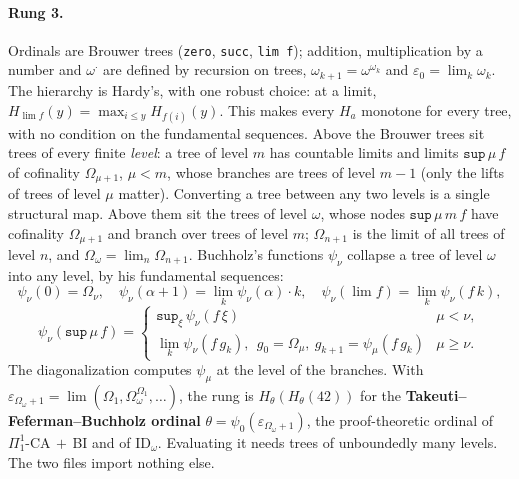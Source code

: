 \documentclass[11pt]{article}
\theoremstyle{definition}
\theoremstyle{remark}
\newcommand{\lean}[1]{\texttt{#1}}
\begin{document}
\paragraph{Rung 3.} Ordinals are Brouwer trees (\lean{zero}, \lean{succ},
\lean{lim f}); addition, multiplication by a number and $\omega^{\cdot}$ are
defined by recursion on trees, $\omega_{k+1}=\omega^{\omega_k}$ and
$\varepsilon_0=\lim_k\omega_k$. The hierarchy is Hardy's, with one robust
choice: at a limit, $H_{\lim f}(y)=\max_{i\le y}H_{f(i)}(y)$. This makes every
$H_a$ monotone for every tree, with no condition on the fundamental sequences.
Above the Brouwer trees sit trees of every finite \emph{level}: a tree of
level $m$ has countable limits and limits $\mathtt{sup}\,\mu\,f$ of cofinality
$\Omega_{\mu+1}$, $\mu<m$, whose branches are trees of level $m-1$ (only the
lifts of trees of level $\mu$ matter). Converting a tree between any two
levels is a single structural map. Above them sit the trees of level $\omega$,
whose nodes $\mathtt{sup}\,\mu\,m\,f$ have cofinality $\Omega_{\mu+1}$ and
branch over trees of level $m$; $\Omega_{n+1}$ is the limit of all trees of
level $n$, and $\Omega_\omega=\lim_n\Omega_{n+1}$. Buchholz's functions
$\psi_\nu$ collapse a tree of level $\omega$ into any level, by his
fundamental sequences:
\[
\psi_\nu(0)=\Omega_\nu,\quad
\psi_\nu(\alpha+1)=\lim_k\psi_\nu(\alpha)\cdot k,\quad
\psi_\nu(\lim f)=\lim_k\psi_\nu(f\,k),
\]
\[
\psi_\nu(\mathtt{sup}\,\mu\,f)=
\begin{cases}
\mathtt{sup}_\xi\,\psi_\nu(f\,\xi) & \mu<\nu,\\
\lim_k\psi_\nu(f\,g_k),\ \ g_0=\Omega_\mu,\ g_{k+1}=\psi_\mu(f\,g_k) & \mu\ge\nu.
\end{cases}
\]
The diagonalization computes $\psi_\mu$ at the level of the branches. With
$\varepsilon_{\Omega_\omega+1}=\lim(\Omega_1,\Omega_\omega^{\Omega_1},\dots)$, the
rung is $H_\theta(H_\theta(42))$ for the \textbf{Takeuti--Feferman--Buchholz
ordinal} $\theta=\psi_0(\varepsilon_{\Omega_\omega+1})$, the proof-theoretic
ordinal of $\Pi^1_1$-CA$\,+\,$BI and of $\mathrm{ID}_\omega$. Evaluating it
needs trees of unboundedly many levels. The two files import nothing else.
\end{document}
